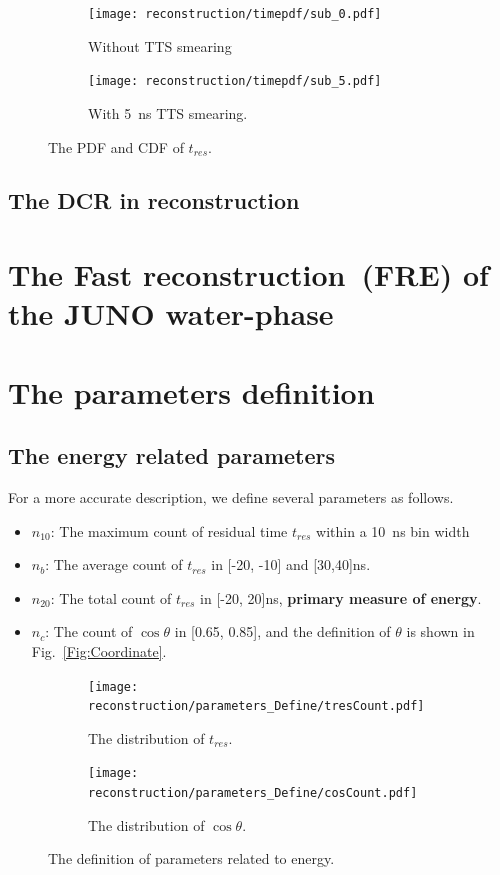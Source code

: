 \begin{figure}[htbp]
	\centering
	\begin{subfigure}{0.5\textwidth}
		\centering
		\texttt{[image: reconstruction/timepdf/sub\_0.pdf]}
		\caption{Without TTS smearing}
		\label{fig:smear0}
	\end{subfigure}%
	\begin{subfigure}{0.5\textwidth}
		\centering
		\texttt{[image: reconstruction/timepdf/sub\_5.pdf]}
		\caption{With \SI{5}{ns} TTS smearing.}
		\label{fig:smear5}
	\end{subfigure}
	\caption{The PDF and CDF of $t_{res}$.}
	\label{fig:time}
\end{figure}

\subsection{The DCR in reconstruction}

\section{The Fast reconstruction~(FRE) of the JUNO water-phase}

\section{The parameters definition}
\subsection{The energy related parameters}
For a more accurate description, we define several parameters as follows.
\begin{itemize}
	\item $n_{10}$: The maximum count of residual time $t_{res}$ within a
	      \SI{10}{\nano s} bin width
	\item $n_{b}$: The average count of $t_{res}$ in [-20, -10] and
		      [30,40]\si{\nano s}.
	\item $n_{20}$: The total count of $t_{res}$ in [-20, 20]\si{\nano s},
	      \textbf{primary measure of energy}.
	\item $n_c$: The count of $\cos\theta$ in [0.65, 0.85], and the definition of $\theta$ is shown in Fig.~\ref{Fig:Coordinate}.
\end{itemize}

\begin{figure}[htbp]
	\centering
	\begin{subfigure}{0.5\textwidth}
		\centering
		\texttt{[image: reconstruction/parameters\_Define/tresCount.pdf]}
		\caption{The distribution of $t_{res}$.}
		\label{fig:n20def}
	\end{subfigure}%
	\begin{subfigure}{0.5\textwidth}
		\centering
		\texttt{[image: reconstruction/parameters\_Define/cosCount.pdf]}
		\caption{The distribution of $\cos\theta$.}
		\label{fig:nc}
	\end{subfigure}
	\caption{The definition of parameters related to energy.}
	\label{fig:dual}
\end{figure}

